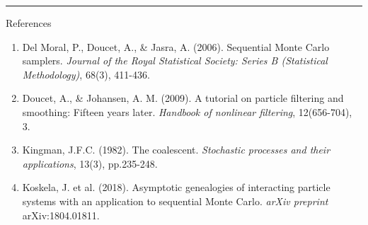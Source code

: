 \documentclass[final, 12pt]{beamer}
\newlength{\colwidth}
\begin{document}
\begin{frame}
\begin{columns}
\begin{column}{\colwidth}
\vspace*{50pt}

\hrule
\begin{block}{References}
\small{
\begin{enumerate}
\item Del Moral, P., Doucet, A., \& Jasra, A. (2006). Sequential Monte Carlo samplers. \textit{Journal of the Royal Statistical Society: Series B (Statistical Methodology)}, 68(3), 411-436.
\item Doucet, A., \& Johansen, A. M. (2009). A tutorial on particle filtering and smoothing: Fifteen years later. \textit{Handbook of nonlinear filtering}, 12(656-704), 3.
\item Kingman, J.F.C. (1982). The coalescent. \textit{Stochastic processes and their applications}, 13(3), pp.235-248.
\item Koskela, J. et al. (2018).  Asymptotic genealogies of interacting particle systems with an application to sequential Monte Carlo. \textit{arXiv preprint} arXiv:1804.01811.
\end{enumerate}
}
\end{block}

\end{column}
\end{columns}

\end{frame}
\end{document}
